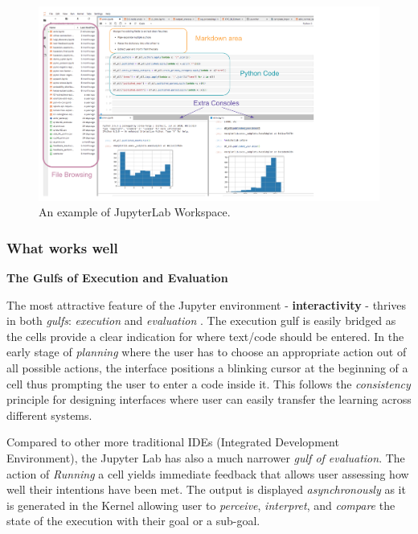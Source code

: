\documentclass[12pt,letterpaper]{article}
\begin{document}
\begin{figure}[hbt!]
\centering
\includegraphics[scale=.5]{figures/project-principles/jupyter.png}
\caption{An example of JupyterLab Workspace.}
\label{fig::1}
\end{figure}

\subsubsection*{What works well}

\textbf{The Gulfs of Execution and Evaluation}

The most attractive feature of the Jupyter environment - \textbf{interactivity} - thrives in both \textit{gulfs}: \textit{execution} and \textit{evaluation} \cite{norman2013design}. The execution gulf is easily bridged as the cells provide a clear indication for where text/code should be entered. In the early stage of \textit{planning} where the user has to choose an appropriate action out of all possible actions, the interface positions a blinking cursor at the beginning of a cell thus prompting the user to enter a code inside it. This follows the \textit{consistency} principle for designing interfaces where user can easily transfer the learning across different systems.

Compared to other more traditional IDEs (Integrated Development Environment), the Jupyter Lab has also a much narrower \textit{gulf of evaluation}. The action of \textit{Running} a cell yields immediate feedback that allows user assessing how well their intentions have been met. The output is displayed \textit{asynchronously} as it is generated in the Kernel allowing user to \textit{perceive}, \textit{interpret}, and \textit{compare} the state of the execution with their goal or a sub-goal.
\end{document}
